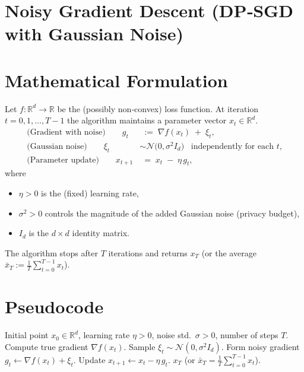 \documentclass[11pt]{article}
\newcommand{\R}{\mathbb{R}}
\begin{document}
\section*{Noisy Gradient Descent (DP‑SGD with Gaussian Noise)}

\section*{Mathematical Formulation}
Let $f:\R^{d}\rightarrow\R$ be the (possibly non‑convex) loss function.  
At iteration $t=0,1,\dots,T-1$ the algorithm maintains a parameter vector $x_t\in\R^{d}$.
\begin{align}
    \text{(Gradient with noise)}\qquad 
    g_t &\;:=\; \nabla f(x_t) \;+\; \xi_t ,                                   \label{eq:gt}\\[4pt]
    \text{(Gaussian noise)}\qquad 
    \xi_t &\sim \mathcal{N}\!\bigl(0,\sigma^{2} I_d\bigr) \;\;\; \text{independently for each $t$,} \label{eq:noise}\\[4pt]
    \text{(Parameter update)}\qquad 
    x_{t+1} &\;=\; x_t \;-\; \eta\, g_t ,                                   \label{eq:update}
\end{align}
where 
\begin{itemize}
    \item $\eta>0$ is the (fixed) learning rate,
    \item $\sigma^{2}>0$ controls the magnitude of the added Gaussian noise (privacy budget),
    \item $I_d$ is the $d\times d$ identity matrix.
\end{itemize}
The algorithm stops after $T$ iterations and returns $x_T$ (or the average $\bar x_T:=\frac1T\sum_{t=0}^{T-1}x_t$).

\section*{Pseudocode}
\begin{algorithm}[H]
\caption{Noisy Gradient Descent (DP‑SGD)}\label{alg:dp-sgd}
\begin{algorithmic}[1]
\Require Initial point $x_0\in\R^d$, learning rate $\eta>0$, noise std.\ $\sigma>0$, number of steps $T$.
    \State Compute true gradient $ \nabla f(x_t)$.
    \State Sample $\xi_t \sim \mathcal{N}(0,\sigma^{2}I_d)$.
    \State Form noisy gradient $g_t \gets \nabla f(x_t)+\xi_t$.
    \State Update $x_{t+1} \gets x_t - \eta\, g_t$.
\EndFor
\State \Return $x_T$ (or $\bar x_T=\frac1T\sum_{t=0}^{T-1}x_t$).
\end{algorithmic}
\end{algorithm}
\end{document}
